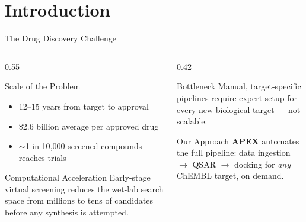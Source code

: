 \section{Introduction}

\begin{frame}{The Drug Discovery Challenge}
  \begin{columns}[T]
    \begin{column}{0.55\textwidth}
      \begin{block}{Scale of the Problem}
        \begin{itemize}
          \item 12--15 years from target to approval
          \item \$2.6 billion average per approved drug
          \item $\sim$1 in 10{,}000 screened compounds reaches trials
        \end{itemize}
      \end{block}
      \vspace{0.4cm}
      \begin{exampleblock}{Computational Acceleration}
        Early-stage virtual screening reduces the wet-lab search
        space from millions to tens of candidates before any
        synthesis is attempted.
      \end{exampleblock}
    \end{column}
    \begin{column}{0.42\textwidth}
      \begin{alertblock}{Bottleneck}
        Manual, target-specific pipelines require expert setup for
        every new biological target — not scalable.
      \end{alertblock}
      \vspace{0.4cm}
      \begin{block}{Our Approach}
        \textbf{APEX} automates the full pipeline:
        data ingestion $\rightarrow$ QSAR $\rightarrow$ docking
        for \emph{any} ChEMBL target, on demand.
      \end{block}
    \end{column}
  \end{columns}
\end{frame}

